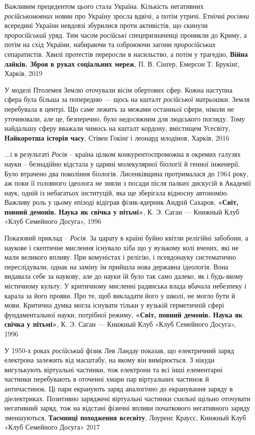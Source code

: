 Важливим прецедентом цього стала Україна. Кількість негативних
\emph{російськомовних} новин про Україну зросла вдвічі, а потім утричі. Етнічні
\emph{росіяни} всередині України невдовзі збурилися проти активістів, що
скинули \emph{проросійський} уряд. Тим часом \emph{російські} спецпризначенці
проникли до Криму, а потім на схід України, набираючи та озброюючи загони
\emph{проросійських} сепаратистів. Хвилі протестів переросли в насильство, а
потім у трагедію, \textbf{Війна лайків. Зброя в руках соціальних мереж}, П. В.
Сінґер, Емерсон Т. Брукінґ, Харків, 2019

У моделі Птолемея Землю оточували вісім обертових сфер. Кожна наступна сфера
була більша за попередню — щось на кшталт \emph{російської} матрьошки. Земля
перебувала в центрі. Що саме лежить за межами останньої сфери, ніколи не
уточнювали, але це, безперечно, було недосяжним для людського погляду. Тому
найдальшу сферу вважали чимось на кшталт кордону, вмістищем Усесвіту,
\textbf{Найкоротша історія часу}, Стівен Гокінґ і леонард млодінов, Харків,
2016

...і в результаті \emph{Росія} – країна цілком конкурентоспроможна в окремих галузях
науки – безнадійно відстала у царині молекулярної біології й генної інженерії.
Було втрачено два покоління біологів. Лисенківщина протрималася до 1964 року,
аж поки її головного ідеолога не зняли з посади після палких дискусій в
Академії наук, одній із небагатьох інституцій, яка ще зберігала відносну
автономію. Важливу роль у цьому епізоді відіграв фізик-ядерник Андрій Сахаров,
\textbf{«Світ, повний демонів. Наука як свічка у пітьмі»}, К. Э. Саган —
Книжный Клуб «Клуб Семейного Досуга», 1996

Показовий приклад – \emph{Росія}. За царату в країні буйно квітли релігійні забобони,
а наукове і скептичне мислення існувало хіба що у вузькому колі вчених, які
не мали великого впливу. При комуністах і релігію, і псевдонауку систематично
переслідували, однак на заміну їм прийшла нова державна ідеологія. Вона
видавала себе за наукову, але до науки їй було так само далеко, як і будь-якому
містичному культу. У критичному мисленні радянська влада вбачала небезпеку і
карала за його прояви. Про те, щоб викладати його у школі, не могло бути й
мови. Критична думка могла існувати тільки у вузькій герметичній сфері
фундаментальної науки, потрібної режиму,
\textbf{«Світ, повний демонів. Наука як свічка у пітьмі»}, К. Э. Саган —
Книжный Клуб «Клуб Семейного Досуга», 1996

У 1950-х роках \emph{російський} фізик Лев Ландау показав, що електричний заряд
електрона залежить від масштабу, на якому він вимірюється. З нікуди вигулькують
віртуальні частинки, тож електрони та всі інші елементарні частинки перебувають
в оточенні хмари пар віртуальних частинок й античастинок. Ці пари екранують
заряд аналогічно до екранування заряду в діелектриках. Позитивно заряджені
віртуальні частинки схильні щільно оточувати негативний заряд, тож на відстані
фізичні впливи початкового негативного заряду зменшуються, \textbf{Таємниці
походження всесвіту}, Лоуренс Краусс, Книжный Клуб «Клуб Семейного Досуга» 2017

